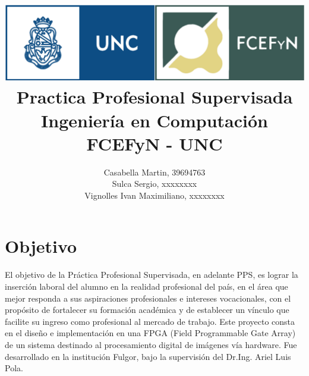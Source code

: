 \documentclass[a4paper]{article}
\begin{document}
\title{%
\includegraphics[scale = 0.5]{./header_unc.png}\\[1.0 cm]	%
  Practica Profesional Supervisada\\
  \large Ingeniería en Computación FCEFyN - UNC
  }


  \author{ Casabella Martin, 39694763\\
			Sulca Sergio, xxxxxxxx\\
			Vignolles Ivan Maximiliano, xxxxxxxx
}
%
%
%
%

\clearpage
\maketitle

\section*{Objetivo} \label{objetivo_sec}
El objetivo de la Práctica Profesional Supervisada, en adelante PPS, es lograr la inserción laboral del alumno en la realidad profesional del país, en el área que mejor responda a sus aspiraciones profesionales e intereses vocacionales, con el propósito de fortalecer su formación académica y de establecer un vínculo que facilite su ingreso como profesional al mercado de trabajo. 
Este proyecto consta en el diseño e implementación en una FPGA (Field Programmable Gate Array) de un sistema destinado al procesamiento digital de imágenes vía hardware. 
Fue desarrollado en la institución Fulgor, bajo la supervisión del Dr.Ing. Ariel Luis Pola.
\end{document}
